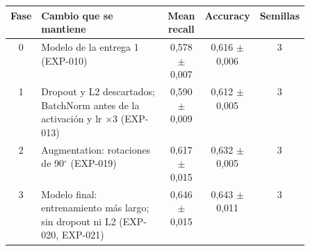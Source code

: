 \begin{tabular}{cp{0.50\linewidth}ccc}
\toprule
Fase & Cambio que se mantiene & Mean recall & Accuracy & Semillas \\
\midrule
0 & Modelo de la entrega 1 (EXP-010) & 0,578 $\pm$ 0,007 & 0,616 $\pm$ 0,006 & 3 \\
1 & Dropout y L2 descartados; BatchNorm antes de la activación y lr $\times$3 (EXP-013) & 0,590 $\pm$ 0,009 & 0,612 $\pm$ 0,005 & 3 \\
2 & Augmentation: rotaciones de 90$^\circ$ (EXP-019) & 0,617 $\pm$ 0,015 & 0,632 $\pm$ 0,005 & 3 \\
3 & Modelo final: entrenamiento más largo; sin dropout ni L2 (EXP-020, EXP-021) & 0,646 $\pm$ 0,015 & 0,643 $\pm$ 0,011 & 3 \\
\bottomrule
\end{tabular}
